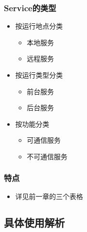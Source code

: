 \documentclass[9pt, b5paper]{article}
\begin{document}
\subsubsection{Service的类型}
\label{sec-3-3-1}
\begin{itemize}
\item 按运行地点分类
\begin{itemize}
\item 本地服务
\item 远程服务
\end{itemize}
\item 按运行类型分类
\begin{itemize}
\item 前台服务
\item 后台服务
\end{itemize}
\item 按功能分类
\begin{itemize}
\item 可通信服务
\item 不可通信服务
\end{itemize}
\end{itemize}
\subsubsection{特点}
\label{sec-3-3-2}
\begin{itemize}
\item 详见前一章的三个表格
\end{itemize}
\subsection{具体使用解析}
\label{sec-3-4}
\end{document}
